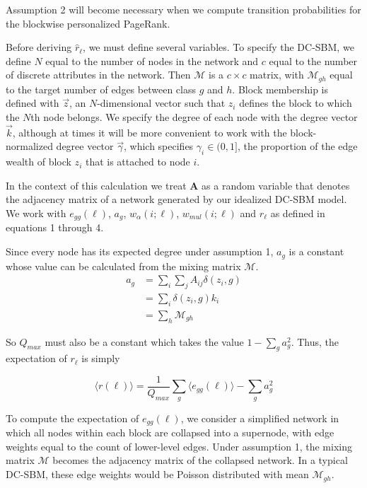 \documentclass[12pt]{article}
\begin{document}
Assumption 2 will become necessary when we compute transition probabilities for the blockwise personalized PageRank. 

Before deriving $\hat{r}_\ell$, we must define several variables.  To specify the DC-SBM, we define $N$ equal to the number of nodes in the network and $c$ equal to the number of discrete attributes in the network.  Then $\mathcal{M}$ is a $c \times c$ matrix, with $\mathcal{M}_{gh}$ equal to the target number of edges between class $g$ and $h$.  Block membership is defined with $\vec{z}$, an $N$-dimensional vector such that $z_i$ defines the block to which the $N$th node belongs.  We specify the degree of each node with the degree vector $\vec{k}$, although at times it will be more convenient to work with the block-normalized degree vector $\vec{\gamma}$, which specifies $\gamma_i \in (0, 1]$, the proportion of the edge wealth of block $z_i$ that is attached to node $i$.  \cite{clauset:2021}

In the context of this calculation we treat $\mathbf{A}$ as a random variable that denotes the adjacency matrix of a network generated by our idealized DC-SBM model.  We work with $e_{gg}(\ell)$, $a_g$, $w_\alpha(i; \ell)$, $w_{mul}(i; \ell)$ and $r_\ell$ as defined in equations 1 through 4.

Since every node has its expected degree under assumption 1,  $a_g$ is a constant whose value can be calculated from the mixing matrix $\mathcal{M}$.
\begin{equation}
  \begin{aligned}
    a_g &= \sum_i \sum_j A_{ij} \delta(z_i, g) \\ 
    &= \sum_i \delta(z_i, g) k_i \\
    &= \sum_h \mathcal{M}_{gh}
  \end{aligned}
\end{equation}

So $Q_{max}$ must also be a constant which takes the value $1 - \sum_g a_g^2$.  Thus, the expectation of $r_\ell$ is simply

\begin{equation}
  \langle r(\ell) \rangle = \frac{1}{Q_{max}} \sum_g \langle e_{gg}(\ell) \rangle - \sum_g a_g^2
\end{equation}

To compute the expectation of $e_{gg}(\ell)$, we consider a simplified network in which all nodes within each block are collapsed into a supernode, with edge weights equal to the count of lower-level edges.  Under assumption 1, the mixing matrix $\mathcal{M}$ becomes the adjacency matrix of the collapsed network.  In a typical DC-SBM, these edge weights would be Poisson distributed with mean $\mathcal{M}_{gh}$.
\end{document}
